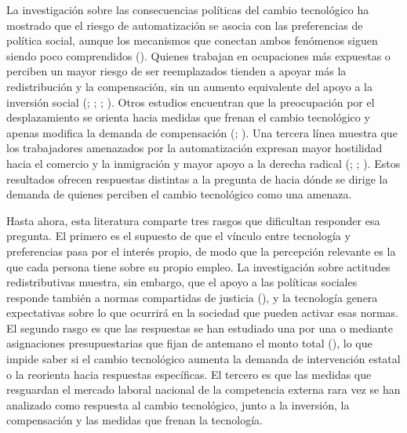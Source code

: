 \documentclass[
  spanish,
  12pt,
]{article}
\begin{document}
La investigación sobre las consecuencias políticas del cambio
tecnológico ha mostrado que el riesgo de automatización se asocia con
las preferencias de política social, aunque los mecanismos que conectan
ambos fenómenos siguen siendo poco comprendidos
().
Quienes trabajan en ocupaciones más expuestas o perciben un mayor riesgo
de ser reemplazados tienden a apoyar más la redistribución y la
compensación, sin un aumento equivalente del apoyo a la inversión social
(;
;
;
).
Otros estudios encuentran que la preocupación por el desplazamiento se
orienta hacia medidas que frenan el cambio tecnológico y apenas modifica
la demanda de compensación (; ). Una tercera línea muestra que los trabajadores amenazados por la
automatización expresan mayor hostilidad hacia el comercio y la
inmigración y mayor apoyo a la derecha radical
(;
;
). Estos resultados
ofrecen respuestas distintas a la pregunta de hacia dónde se dirige la
demanda de quienes perciben el cambio tecnológico como una amenaza.

Hasta ahora, esta literatura comparte tres rasgos que dificultan
responder esa pregunta. El primero es el supuesto de que el vínculo
entre tecnología y preferencias pasa por el interés propio, de modo que
la percepción relevante es la que cada persona tiene sobre su propio
empleo. La investigación sobre actitudes redistributivas muestra, sin
embargo, que el apoyo a las políticas sociales responde también a normas
compartidas de justicia (), y la tecnología genera expectativas sobre lo que ocurrirá en la
sociedad que pueden activar esas normas. El segundo rasgo es que las
respuestas se han estudiado una por una o mediante asignaciones
presupuestarias que fijan de antemano el monto total
(), lo
que impide saber si el cambio tecnológico aumenta la demanda de
intervención estatal o la reorienta hacia respuestas específicas. El
tercero es que las medidas que resguardan el mercado laboral nacional de
la competencia externa rara vez se han analizado como respuesta al
cambio tecnológico, junto a la inversión, la compensación y las medidas
que frenan la tecnología.
\end{document}
